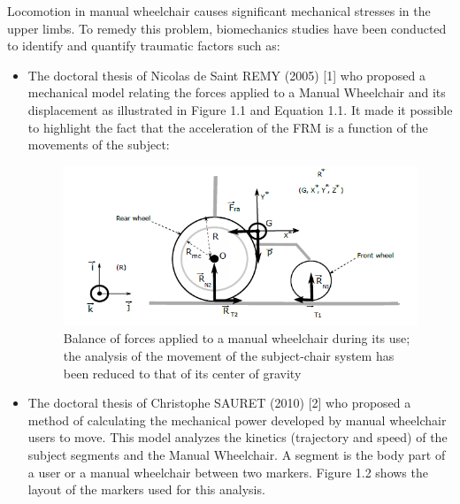 \paragarph{}Locomotion in manual wheelchair causes significant mechanical stresses in the upper limbs. To remedy this problem, biomechanics studies have been conducted to identify and quantify traumatic factors such as:
\begin{itemize}
\item The doctoral thesis of Nicolas de Saint REMY (2005) [1] who proposed a
mechanical model relating the forces applied to a Manual Wheelchair and its displacement as illustrated in Figure 1.1 and Equation 1.1. It made it possible to highlight the fact that the acceleration of the FRM is a function of the movements of the subject:

\begin{figure}[h]
\center
\includegraphics[scale = 0.6]{images/wheelchair_model2}
\caption{Balance of forces applied to a manual wheelchair during its use; the analysis of the movement of the subject-chair system has been reduced to that of its center of gravity }
\label{Wheelchair_model}
\end{figure}

\item The doctoral thesis of Christophe SAURET (2010) [2] who proposed a method of calculating the mechanical power developed by manual wheelchair users to move. This model analyzes the kinetics (trajectory and speed) of the subject segments and the Manual Wheelchair. A segment is the body part of a user or a manual wheelchair between two markers. Figure 1.2 shows the layout of the markers used for this analysis.


\end{itemize}
